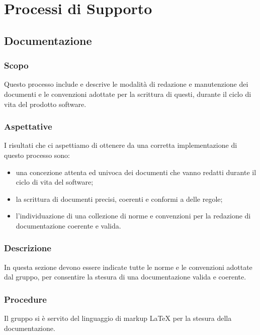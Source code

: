 \section{Processi di Supporto}


\subsection{Documentazione}
	
	\subsubsection{Scopo}
	Questo processo include e descrive le modalità di redazione e manutenzione dei documenti e le convenzioni 
	adottate per la scrittura di questi, durante il ciclo di vita del prodotto software.
	
	\subsubsection{Aspettative}
	I risultati che ci aspettiamo di ottenere da una corretta implementazione di questo processo sono:
	\begin{itemize}  
		\item una concezione attenta ed univoca dei documenti che vanno redatti durante il ciclo di vita del software;
		\item la scrittura di documenti precisi, coerenti e conformi a delle regole;
		\item l’individuazione di una collezione di norme e convenzioni per la redazione di documentazione coerente e valida.
	\end{itemize}

	\subsubsection{Descrizione}
	In questa sezione devono essere indicate tutte le norme e le convenzioni adottate dal gruppo, per consentire la stesura di una documentazione valida e coerente.
	
	\subsubsection{Procedure}
	Il gruppo si è servito del linguaggio di markup {\LaTeX} per la stesura della documentazione.
	
